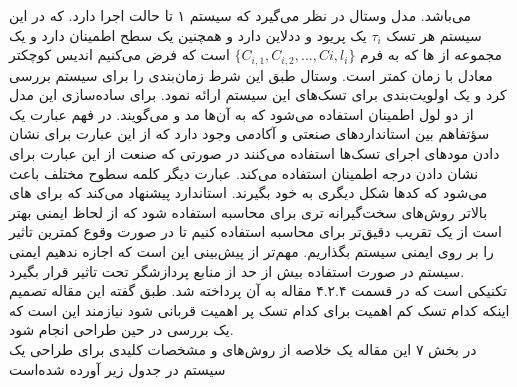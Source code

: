 \documentclass[a4paper, 12pt]{article}
\begin{document}
می‌باشد.
مدل وستال در نظر می‌گیرد که سیستم  ۱ تا
حالت اجرا دارد.
که در این سیستم هر تسک
$\tau_i$
یک پریود و ددلاین دارد و همچنین یک سطح اطمینان دارد و یک مجموعه از
ها که به فرم
$\{C_{i,1},C_{i,2},...,C{i,l_i}\}$
است که فرض می‌کنیم اندیس کوچکتر معادل با زمان کمتر است.
وستال طبق این شرط زمان‌بندی را برای سیستم بررسی کرد و یک اولویت‌بندی برای تسک‌های این سیستم
ارائه نمود.
برای ساده‌سازی این مدل از دو لول اطمینان استفاده می‌شود که به آن‌ها مد
و
می‌گویند.
در فهم عبارت
یک سؤتفاهم بین استاندارد‌های صنعتی و آکادمی وجود دارد که از این عبارت برای نشان دادن
مود‌های اجرای تسک‌ها استفاده می‌کنند در صورتی که صنعت از این عبارت برای نشان دادن
درجه اطمینان استفاده می‌کند.
عبارت دیگر کلمه
سطوح مختلف
باعث می‌شود که کد‌ها شکل دیگری به خود بگیرند. استاندارد پیشنهاد می‌کند که برای
های بالاتر روش‌های سخت‌گیرانه تری برای محاسبه
استفاده شود که از لحاظ ایمنی بهتر است از یک تقریب دقیق‌تر برای محاسبه
استفاده کنیم تا در صورت وقوع
کمترین تاثیر را بر روی ایمنی سیستم بگذاریم.
مهم‌تر از پیش‌بینی
این است که اجازه ندهیم ایمنی سیستم در صورت استفاده بیش از حد از منابع پردازشگر
تحت تاثیر قرار بگیرد. \\
تکنیکی است که در قسمت ۴.۲.۴ مقاله به آن پرداخته شد. طبق گفته این مقاله تصمیم اینکه کدام تسک
کم اهمیت برای کدام تسک پر اهمیت قربانی شود نیازمند این است که یک بررسی در حین طراحی
انجام شود. \\
در بخش ۷ این مقاله یک خلاصه از روش‌های و مشخصات کلیدی برای طراحی یک سیستم
در جدول زیر آورده شده‌است
\end{document}
